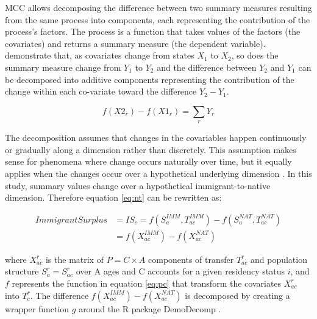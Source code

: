MCC allows decomposing the difference between two summary measures resulting from the same process into components, each representing the contribution of the process's factors.
The process is a function that takes values of the factors (the covariates) and returns a summary measure (the dependent variable).
\citet{horiuchiDecompositionMethodBased2008} demonstrate that, as covariates change from states \( X_1 \) to \( X_2 \),  so does the summary measure change from \( Y_1 \) to \( Y_2 \)  and the difference between \( Y_2 \) and \( Y_1 \) can be decomposed into additive components representing the contribution of the change within each co-variate toward the difference \( Y_2 - Y_1\).

\begin{equation}\label{eq:ho}
  f(X2_{r}) - f(X1_{r}) = \displaystyle\sum_{r}Y_{r}
\end{equation}

The decomposition assumes that changes in the covariables happen continuously or gradually along a dimension rather than discretely.
This assumption makes sense for phenomena where change occurs naturally over time, but it equally applies when the changes occur over a hypothetical underlying dimension \citep[p.~790]{horiuchiDecompositionMethodBased2008}.
In this study, summary values change over a hypothetical immigrant-to-native dimension.
Therefore equation \eqref{eq:nt} can be rewritten as:

\begin{equation}
\begin{split}
  Immigrant Surplus &= IS_{c}=f(S^{IMM}_a, T^{IMM}_{ac})-f(S^{NAT}_a, T^{NAT}_{ac}) \nonumber \\
&= f(X^{IMM}_{ac})-f(X^{NAT}_{ac}) \label{eq:dc}
\end{split}
\end{equation}

\vspace{0.7em}\par
where \( X^{r}_{ac}\) is the matrix of \( P=C \times A  \) components of transfer \( T^{r}_{ac} \) and population structure \( S^{r}_{a}=S^{r}_{ac} \) over A ages and C accounts for a given residency status \( i \), and \( f \) represents the function in equation \eqref{eq:pc} that transform the covariates \( X^{r}_{ac}\) into \(T^{r}_c\).
The difference \( f(X^{IMM}_{ac}) - f(X^{NAT}_{ac}) \) is decomposed by creating a wrapper function \(g\) around the R \citep{Rstat:2018} package DemoDecomp \citep{DemoDecomp:2018}.

